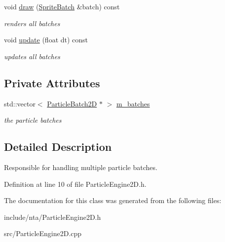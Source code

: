 \begin{DoxyCompactItemize}
void \hyperlink{classnta_1_1ParticleEngine2D_a759937cf45e74162ce85269ddf59237b}{draw} (\hyperlink{classnta_1_1SpriteBatch}{Sprite\+Batch} \&batch) const
\begin{DoxyCompactList}\small\item\em renders all batches \end{DoxyCompactList}\item 
\mbox{\label{classnta_1_1ParticleEngine2D_ad9c7f1be65505d86c23f5754e5fd9430}} 
void \hyperlink{classnta_1_1ParticleEngine2D_ad9c7f1be65505d86c23f5754e5fd9430}{update} (float dt) const
\begin{DoxyCompactList}\small\item\em updates all batches \end{DoxyCompactList}\end{DoxyCompactItemize}
\subsection*{Private Attributes}
\begin{DoxyCompactItemize}
\item 
\mbox{\label{classnta_1_1ParticleEngine2D_a7d928b070dbc09e68d13fd7f9d087549}} 
std\+::vector$<$ \hyperlink{classnta_1_1ParticleBatch2D}{Particle\+Batch2D} $\ast$ $>$ \hyperlink{classnta_1_1ParticleEngine2D_a7d928b070dbc09e68d13fd7f9d087549}{m\+\_\+batches}
\begin{DoxyCompactList}\small\item\em the particle batches \end{DoxyCompactList}\end{DoxyCompactItemize}


\subsection{Detailed Description}
Responsible for handling multiple particle batches. 

Definition at line 10 of file Particle\+Engine2\+D.\+h.



The documentation for this class was generated from the following files\+:\begin{DoxyCompactItemize}
\item 
include/nta/Particle\+Engine2\+D.\+h\item 
src/Particle\+Engine2\+D.\+cpp\end{DoxyCompactItemize}
